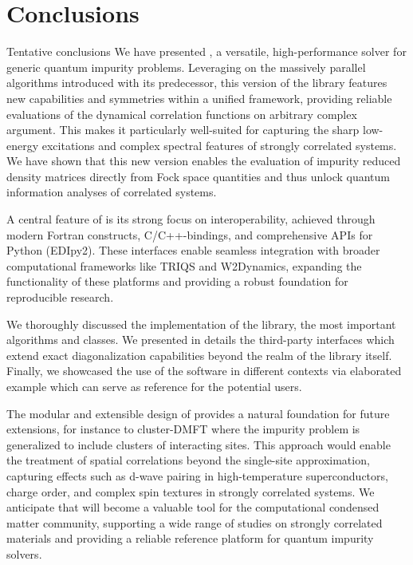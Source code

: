 \documentclass[edipack2.tex]{subfiles}
\begin{document}
\section{Conclusions}
{\color{red} Tentative conclusions}
We have presented \NAME{}, a versatile, high-performance solver for
generic quantum impurity problems. Leveraging on the massively
parallel algorithms introduced with its predecessor, this version of
the library features new capabilities and symmetries within a unified
framework, providing reliable evaluations of the dynamical correlation
functions on arbitrary complex argument.
This makes it particularly well-suited for capturing the sharp
low-energy excitations and complex spectral features of strongly
correlated systems. We have shown that this new version enables the evaluation of impurity
reduced density matrices directly from Fock space quantities and thus unlock 
quantum information analyses of correlated systems.  

A central feature of \NAME is its strong focus on interoperability,
achieved through modern Fortran constructs, C/C++-bindings, and
comprehensive APIs for Python (EDIpy2). 
These interfaces enable seamless integration with broader
computational frameworks like TRIQS and W2Dynamics, expanding the
functionality of these platforms and providing a robust foundation for
reproducible research.

We thoroughly discussed the implementation of the \NAME library, the
most important algorithms and classes. We presented in
details the third-party interfaces which extend exact diagonalization
capabilities beyond the realm of the library itself.   
Finally, we showcased the use of the \NAME software in different
contexts via elaborated example which can serve as reference for the
potential users. 

The modular and extensible design of \NAME provides a
natural foundation for future extensions, for instance to cluster-DMFT where the
impurity problem is generalized to include clusters of interacting
sites. This approach would enable the treatment of spatial
correlations beyond the single-site approximation, capturing effects
such as d-wave pairing in high-temperature superconductors, charge
order, and complex spin textures in strongly correlated systems.
We anticipate that \NAME will become a valuable tool for the
computational condensed matter community, supporting a wide range of
studies on strongly correlated materials and providing a reliable
reference platform for quantum impurity solvers.
\end{document}
